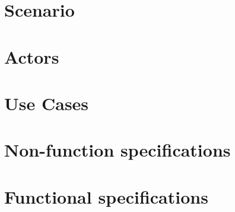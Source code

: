 


\section{Scenario}
\section{Actors}
\section{Use Cases}
\section{Non-function specifications}
\section{Functional specifications}
